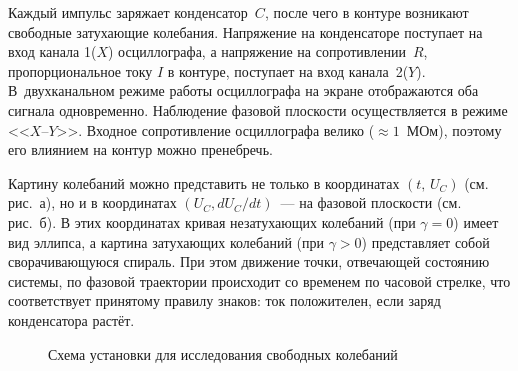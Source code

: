 Каждый импульс заряжает конденсатор~$C$, после чего в контуре возникают 
свободные затухающие колебания. Напряжение на конденсаторе поступает на вход 
канала 1($X$) осциллографа, а напряжение на сопротивлении~$R$, пропорциональное 
току $I$ в контуре, поступает на вход канала~2($Y$). В~двухканальном режиме
работы осциллографа на экране отображаются оба сигнала одновременно. Наблюдение 
фазовой плоскости осуществляется в режиме <<$X$--$Y$>>. Входное сопротивление 
осциллографа велико ($\approx 1$~МОм), поэтому его влиянием на контур 
можно пренебречь. 

Картину колебаний можно представить не только в координатах $(t,\, U_C)$
(см. рис.~а), но и в координатах $(U_C, dU_C/dt)$~--- на фазовой плоскости 
(см. рис.~б). В этих координатах кривая незатухающих колебаний 
(при $\gamma=0$) имеет вид эллипса, а картина затухающих колебаний (при $\gamma > 0$) 
представляет собой сворачивающуюся спираль. При этом движение точки, отвечающей 
состоянию системы, по фазовой траектории происходит со временем по часовой стрелке, 
что соответствует принятому правилу знаков: ток положителен, 
если заряд конденсатора растёт.

\begin{figure}[h!]
    \centering
	\caption{Схема установки для исследования свободных колебаний}
\end{figure}

